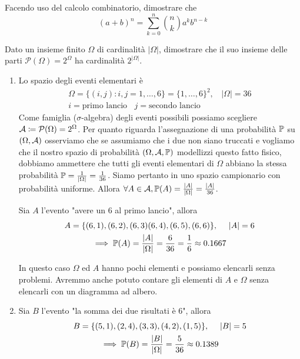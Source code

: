 \Esercizio{}

Facendo uso del calcolo combinatorio, dimostrare che
\begin{equation*}
	(a+b)^{n} =\sum\limits_{k=0}^{n}\binom{n}{k} a^{k} b^{n-k}
\end{equation*}

\Esercizio{}

Dato un insieme finito $\Omega $ di cardinalità $| \Omega | $, dimostrare che il suo insieme delle parti $\mathcal{P}(\Omega) =2^{\Omega }$ ha cardinalità $2^{| \Omega | }$.

\ParteSoluzioni

\Soluzione

\begin{enumerate}
	\item Lo spazio degli eventi elementari è
	\begin{gather*}
		\Omega =\{(i,j) :i,j=1,\dots ,6\} =\{1,\dots ,6\}^{2} ,\ \ \ \ | \Omega | =36\\
		i=\text{primo lancio} \ \ \ \ j=\text{secondo lancio}
	\end{gather*}
	Come famiglia ($\sigma $-algebra) degli eventi possibili possiamo scegliere $\mathcal{A} \coloneqq \mathcal{P}(\Omega) =2^{\Omega }$. Per quanto riguarda l'assegnazione di una probabilità $\mathbb{P}$ su $(\Omega ,\mathcal{A})$ osserviamo che se assumiamo che i due non siano truccati e vogliamo che il nostro spazio di probabilità $(\Omega,\mathcal{A},\mathbb{P})$ modellizzi questo fatto fisico, dobbiamo ammettere che tutti gli eventi elementari di $\Omega $ abbiano la stessa probabilità $\mathbb{P} =\frac{1}{| \Omega | } =\frac{1}{36}$. Siamo pertanto in uno spazio campionario con probabilità uniforme. Allora $\forall A\in \mathcal{A} ,\mathbb{P}(A) =\frac{| A| }{| \Omega | } =\frac{| A| }{36}$.

	Sia $A$ l'evento "avere un $6$ al primo lancio", allora
	\begin{gather*}
		A=\{(6,1) ,(6,2) ,(6,3)(6,4) ,(6,5) ,(6,6)\} ,\ \ \ \ | A| =6\\
		\implies \mathbb{P}(A) =\frac{| A| }{| \Omega | } =\frac{6}{36} =\frac{1}{6} \approx 0.1667
	\end{gather*}

	\begin{oss}
		In questo caso $\Omega $ ed $A$ hanno pochi elementi e possiamo elencarli senza problemi. Avremmo anche potuto contare gli elementi di $A$ e $\Omega $ senza elencarli con un diagramma ad albero.
	\end{oss}

	\item Sia $B$ l'evento "la somma dei due risultati è $6$", allora
	\begin{gather*}
		B=\{(5,1) ,(2,4) ,(3,3) ,(4,2) ,(1,5)\} ,\ \ \ \ | B| =5\\
		\implies \mathbb{P}(B) =\frac{| B| }{| \Omega | } =\frac{5}{36} \approx 0.1389
	\end{gather*}


\end{enumerate}
